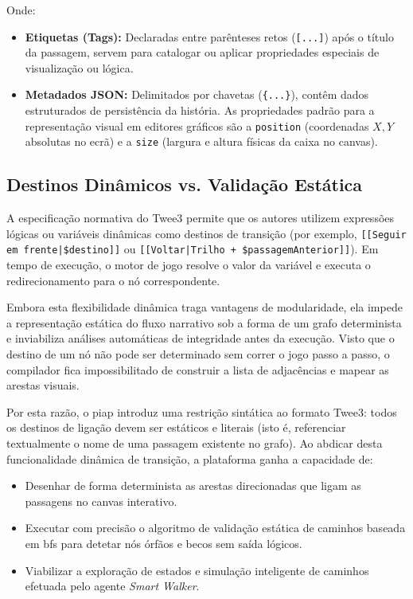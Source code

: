 Onde:
\begin{itemize}
    \item \textbf{Etiquetas (Tags):} Declaradas entre parênteses retos (\texttt{[...]}) após o título da passagem, servem para catalogar ou aplicar propriedades especiais de visualização ou lógica.
    \item \textbf{Metadados JSON:} Delimitados por chavetas (\texttt{\{...\}}), contêm dados estruturados de persistência da história. As propriedades padrão para a representação visual em editores gráficos são a \texttt{position} (coordenadas $X,Y$ absolutas no ecrã) e a \texttt{size} (largura e altura físicas da caixa no canvas).
\end{itemize}

\subsection{Destinos Dinâmicos vs. Validação Estática}
\label{subsec:destinos-dinamicos}
A especificação normativa do Twee3 permite que os autores utilizem expressões lógicas ou variáveis dinâmicas como destinos de transição (por exemplo, \texttt{[[Seguir em frente|\$destino]]} ou \texttt{[[Voltar|Trilho + \$passagemAnterior]]}). Em tempo de execução, o motor de jogo resolve o valor da variável e executa o redirecionamento para o nó correspondente.

Embora esta flexibilidade dinâmica traga vantagens de modularidade, ela impede a representação estática do fluxo narrativo sob a forma de um grafo determinista e inviabiliza análises automáticas de integridade antes da execução. Visto que o destino de um nó não pode ser determinado sem correr o jogo passo a passo, o compilador fica impossibilitado de construir a lista de adjacências e mapear as arestas visuais.

Por esta razão, o \gls{piap} introduz uma restrição sintática ao formato Twee3: todos os destinos de ligação devem ser estáticos e literais (isto é, referenciar textualmente o nome de uma passagem existente no grafo). Ao abdicar desta funcionalidade dinâmica de transição, a plataforma ganha a capacidade de:
\begin{itemize}
    \item Desenhar de forma determinista as arestas direcionadas que ligam as passagens no canvas interativo.
    \item Executar com precisão o algoritmo de validação estática de caminhos baseada em \gls{bfs} para detetar nós órfãos e becos sem saída lógicos.
    \item Viabilizar a exploração de estados e simulação inteligente de caminhos efetuada pelo agente \textit{Smart Walker}.
\end{itemize}

